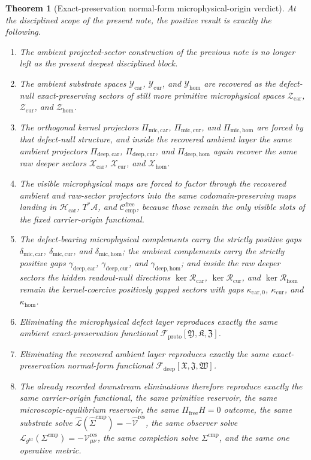 \documentclass[11pt]{article}
\newcommand{\Sub}{\mathcal A}
\newcommand{\ObserverMetric}{g^{\mathrm{br}}}
\newcommand{\CompShift}{\Sigma^{\mathrm{cmp}}}
\newcommand{\CompLift}{\widehat\Sigma^{\mathrm{cmp}}}
\newcommand{\ResidualCore}{\mathcal V_{\mu\nu}^{\mathrm{res}}}
\newcommand{\ResidualLift}{\widehat{\mathcal V}^{\mathrm{res}}}
\newcommand{\SubReducedEin}{\widehat{\mathcal L}}
\newcommand{\ReducedEin}{\mathcal L_{\ObserverMetric}}
\newcommand{\CompFree}{\mathscr C_{\mathrm{cmp}}^{\mathrm{free}}}
\newcommand{\DeepFunctional}{\mathscr F_{\mathrm{deep}}}
\newcommand{\ProtoFunctional}{\mathscr F_{\mathrm{proto}}}
\newcommand{\CarrierClass}{\mathscr H_{\mathrm{car}}}
\newcommand{\PreCarGap}{\kappa_{\mathrm{car},0}}
\newcommand{\CurrentGap}{\kappa_{\mathrm{cur}}}
\newcommand{\HomGap}{\kappa_{\mathrm{hom}}}
\newcommand{\DeepTensorClass}{\mathscr X_{\mathrm{car}}}
\newcommand{\DeepRelabelClass}{\mathscr X_{\mathrm{cur}}}
\newcommand{\DeepFreeClass}{\mathscr X_{\mathrm{hom}}}
\newcommand{\DeepTensor}{\mathfrak X}
\newcommand{\DeepRelabel}{\mathfrak J}
\newcommand{\DeepFree}{\mathfrak W}
\newcommand{\CarRead}{\mathcal R_{\mathrm{car}}}
\newcommand{\CurRead}{\mathcal R_{\mathrm{cur}}}
\newcommand{\HomRead}{\mathcal R_{\mathrm{hom}}}
\newcommand{\ProtoTensorClass}{\mathscr Y_{\mathrm{car}}}
\newcommand{\ProtoRelabelClass}{\mathscr Y_{\mathrm{cur}}}
\newcommand{\ProtoFreeClass}{\mathscr Y_{\mathrm{hom}}}
\newcommand{\ProtoTensor}{\mathfrak Y}
\newcommand{\ProtoRelabel}{\mathfrak K}
\newcommand{\ProtoFree}{\mathfrak Z}
\newcommand{\ProtoCarProj}{\Pi_{\mathrm{deep,car}}}
\newcommand{\ProtoCurProj}{\Pi_{\mathrm{deep,cur}}}
\newcommand{\ProtoHomProj}{\Pi_{\mathrm{deep,hom}}}
\newcommand{\ProtoCarGap}{\gamma_{\mathrm{deep,car}}}
\newcommand{\ProtoCurGap}{\gamma_{\mathrm{deep,cur}}}
\newcommand{\ProtoHomGap}{\gamma_{\mathrm{deep,hom}}}
\newcommand{\UltraTensorClass}{\mathscr Z_{\mathrm{car}}}
\newcommand{\UltraRelabelClass}{\mathscr Z_{\mathrm{cur}}}
\newcommand{\UltraFreeClass}{\mathscr Z_{\mathrm{hom}}}
\newcommand{\UltraCarProj}{\Pi_{\mathrm{mic,car}}}
\newcommand{\UltraCurProj}{\Pi_{\mathrm{mic,cur}}}
\newcommand{\UltraHomProj}{\Pi_{\mathrm{mic,hom}}}
\newcommand{\UltraCarGap}{\delta_{\mathrm{mic,car}}}
\newcommand{\UltraCurGap}{\delta_{\mathrm{mic,cur}}}
\newcommand{\UltraHomGap}{\delta_{\mathrm{mic,hom}}}
\newtheorem{theorem}{Theorem}
\begin{document}
\begin{theorem}[Exact-preservation normal-form microphysical-origin verdict]
\label{thm:verdict}
At the disciplined scope of the present note, the positive result is exactly the following.
\begin{enumerate}
    \item The ambient projected-sector construction of the previous note is no longer left as the present deepest disciplined block.
    \item The ambient substrate spaces \(\ProtoTensorClass\), \(\ProtoRelabelClass\), and \(\ProtoFreeClass\) are recovered as the defect-null exact-preserving sectors of still more primitive microphysical spaces \(\UltraTensorClass\), \(\UltraRelabelClass\), and \(\UltraFreeClass\).
    \item The orthogonal kernel projectors \(\UltraCarProj\), \(\UltraCurProj\), and \(\UltraHomProj\) are forced by that defect-null structure, and inside the recovered ambient layer the same ambient projectors \(\ProtoCarProj\), \(\ProtoCurProj\), and \(\ProtoHomProj\) again recover the same raw deeper sectors \(\DeepTensorClass\), \(\DeepRelabelClass\), and \(\DeepFreeClass\).
    \item The visible microphysical maps are forced to factor through the recovered ambient and raw-sector projectors into the same codomain-preserving maps landing in \(\CarrierClass\), \(T^*\Sub\), and \(\CompFree\), because those remain the only visible slots of the fixed carrier-origin functional.
    \item The defect-bearing microphysical complements carry the strictly positive gaps \(\UltraCarGap\), \(\UltraCurGap\), and \(\UltraHomGap\); the ambient complements carry the strictly positive gaps \(\ProtoCarGap\), \(\ProtoCurGap\), and \(\ProtoHomGap\); and inside the raw deeper sectors the hidden readout-null directions \(\ker\CarRead\), \(\ker\CurRead\), and \(\ker\HomRead\) remain the kernel-coercive positively gapped sectors with gaps \(\PreCarGap\), \(\CurrentGap\), and \(\HomGap\).
    \item Eliminating the microphysical defect layer reproduces exactly the same ambient exact-preservation functional \(\ProtoFunctional[\ProtoTensor,\ProtoRelabel,\ProtoFree]\).
    \item Eliminating the recovered ambient layer reproduces exactly the same exact-preservation normal-form functional \(\DeepFunctional[\DeepTensor,\DeepRelabel,\DeepFree]\).
    \item The already recorded downstream eliminations therefore reproduce exactly the same carrier-origin functional, the same primitive reservoir, the same microscopic-equilibrium reservoir, the same \(\Pi_{\mathrm{free}}H=0\) outcome, the same substrate solve \(\SubReducedEin(\CompLift)=-\ResidualLift\), the same observer solve \(\ReducedEin(\CompShift)=-\ResidualCore\), the same completion solve \(\Sigma^{\mathrm{cmp}}\), and the same one operative metric.

\end{enumerate}
\end{theorem}
\end{document}
